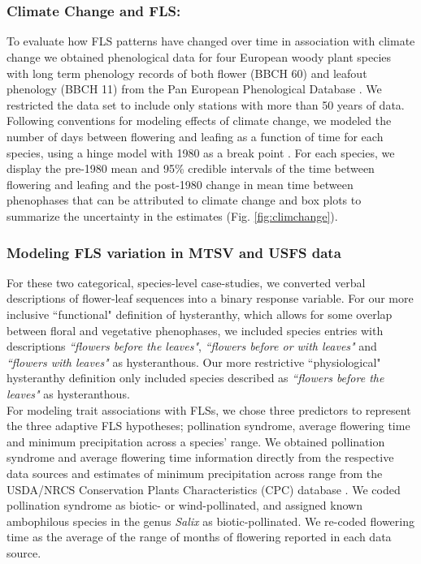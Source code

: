 \documentclass[11pt]{article}
\begin{document}
  \pagebreak[4]
  
  \section*{}\label{Methods S1}
  
  \subsubsection*{Climate Change and FLS:}
  \noindent To evaluate how FLS patterns have changed over time in association with climate change we obtained phenological data for four European woody plant species with long term phenology records of both flower (BBCH 60) and leafout phenology (BBCH 11) from the Pan European Phenological Database \citep{PEP725}. We restricted the data set to include only stations with more than 50 years of data. Following conventions for modeling effects of climate change, we modeled the number of days between flowering and leafing as a function of time for each species, using a hinge model with 1980 as a break point \citep{IPCC2013,Kharouba2018}. For each species, we display the pre-1980 mean and 95\% credible intervals of the time between flowering and leafing and the post-1980 change in mean time between phenophases that can be attributed to climate change and box plots to summarize the uncertainty in the estimates (Fig. \ref{fig:climchange}).
  
  \subsubsection*{Modeling FLS variation in MTSV and USFS data}
  \noindent For these two categorical, species-level case-studies, we converted verbal descriptions of flower-leaf sequences into a binary response variable. For our more inclusive ``functional" definition of hysteranthy, which allows for some overlap between floral and vegetative phenophases, we included species entries with descriptions \textit{``flowers before the leaves"}, \textit{``flowers before or with leaves"} and \textit{``flowers with leaves"} as hysteranthous. Our more restrictive ``physiological" hysteranthy definition only included species described as \textit{``flowers before the leaves"} as hysteranthous.\\
  
  \noindent For modeling trait associations with FLSs, we chose three predictors to represent the three adaptive FLS hypotheses; pollination syndrome, average flowering time and minimum precipitation across a species' range. We obtained pollination syndrome and average flowering time information directly from the respective data sources and estimates of minimum precipitation across range from the USDA/NRCS Conservation Plants Characteristics (CPC) database \citep{usdancrs}. We coded pollination syndrome as biotic- or wind-pollinated, and assigned known ambophilous species in the genus \textit{Salix} as biotic-pollinated. We re-coded flowering time as the average of the range of months of flowering reported in each data source.\\
  
\end{document}

